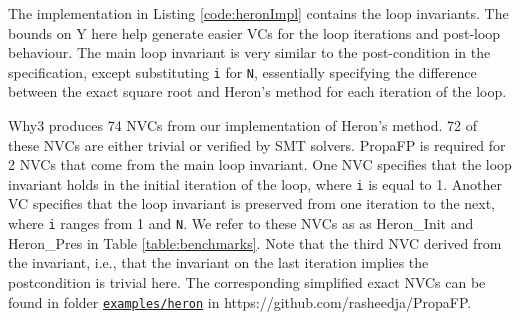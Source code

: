 \documentclass[runningheads]{llncs}
\begin{document}

The implementation in Listing \ref{code:heronImpl} contains the loop invariants.
The bounds on Y here help generate easier VCs for the loop iterations and post-loop behaviour.
The main loop invariant is very similar to the post-condition in the specification, except substituting \lstinline{i} for \lstinline{N}, essentially specifying the difference between the exact square root and Heron's method for each iteration of the loop.

Why3 produces 74 NVCs from our implementation of Heron's method.
72 of these NVCs are either trivial or verified by SMT solvers. %
PropaFP is required for 2 NVCs that come from the main loop invariant. %
One NVC specifies that the loop invariant holds in the initial iteration of the loop, where \lstinline{i} is equal to 1.
Another VC specifies that the loop invariant is preserved from one iteration to the next, where \lstinline{i} ranges from 1 and \lstinline{N}.
We refer to these NVCs as  as Heron\_Init and Heron\_Pres in Table \ref{table:benchmarks}.
Note that the third NVC derived from the invariant, i.e., that the invariant on the last iteration implies the postcondition is trivial here.
The corresponding simplified exact NVCs can be found in folder \href{https://github.com/rasheedja/PropaFP/tree/master/examples/heron/txt}{\texttt{examples/heron}} in https://github.com/rasheedja/PropaFP.
\end{document}
